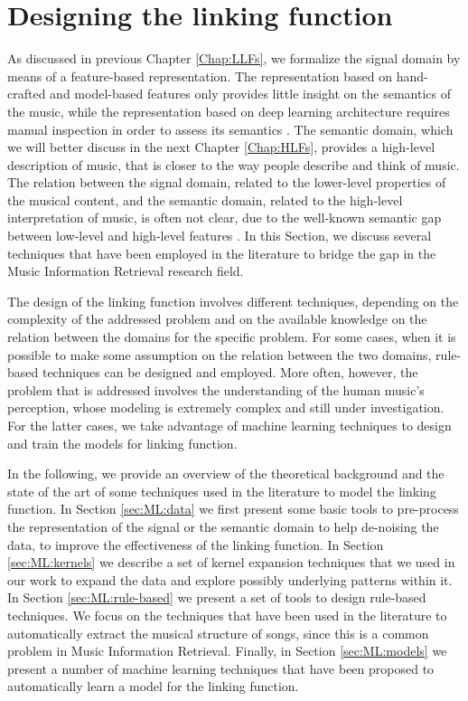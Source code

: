 \chapter{Designing the linking function}\label{Chap:ML}
As discussed in previous Chapter \ref{Chap:LLFs}, we formalize the signal domain by means of a feature-based representation. The representation based on hand-crafted and model-based features only provides little insight on the semantics of the music, while the representation based on deep learning architecture requires manual inspection in order to assess its semantics \cite{Le2013,choi2015auralisation}. The semantic domain, which we will  better discuss in the next Chapter \ref{Chap:HLFs}, provides a high-level description of music, that is closer to the way people describe and think of music. The relation between the signal domain, related to the lower-level properties of the musical content, and the semantic domain, related to the high-level interpretation of music, is often not clear, due to the well-known semantic gap between low-level and high-level features \cite{Celma2006}. In this Section, we discuss several techniques that have been employed in the literature to bridge the gap in the Music Information Retrieval research field. 

The design of the linking function involves different techniques, depending on the complexity of the addressed problem and on the available knowledge on the relation between the domains for the specific problem. For some cases, when it is possible to make some assumption on the relation between the two domains, rule-based techniques can be designed and employed. More often, however, the problem that is addressed involves the understanding of the human music's perception, whose modeling is extremely complex and still under investigation. For the latter cases, we take advantage of machine learning techniques to design and train the models for linking function. 

In the following, we provide an overview of the theoretical background and the state of the art of some techniques used in the literature to model the linking function. In Section \ref{sec:ML:data} we first present some basic tools to pre-process the representation of the signal or the semantic domain to help de-noising the data, to improve the effectiveness of the linking function. In Section \ref{sec:ML:kernels} we describe a set of kernel expansion techniques that we used in our work to expand the data and explore possibly underlying patterns within it. In Section \ref{sec:ML:rule-based} we present a set of tools to design rule-based techniques. We focus on the techniques that have been used in the literature to automatically extract the musical structure of songs, since this is a common problem in Music Information Retrieval. Finally, in Section \ref{sec:ML:models} we present a number of machine learning techniques that have been proposed to automatically learn a model for the linking function.

